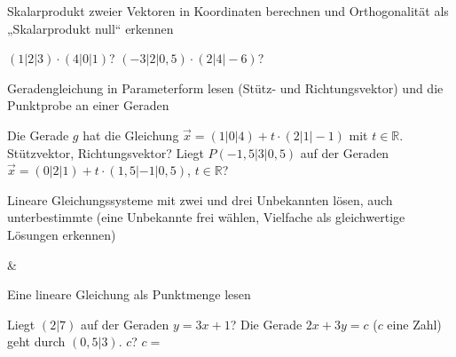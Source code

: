 \begin{aufgabe}{Skalarprodukt zweier Vektoren in Koordinaten berechnen und Orthogonalität als „Skalarprodukt null“ erkennen}
\begin{teile}
\teil $(1 | 2 | 3) \cdot (4 | 0 | 1)$?
\teil $(-3 | 2 | 0{,}5) \cdot (2 | 4 | -6)$?
\end{teile}
\end{aufgabe}

\begin{aufgabe}{Geradengleichung in Parameterform lesen (Stütz- und Richtungsvektor) und die Punktprobe an einer Geraden}
\begin{teile}
\teil Die Gerade $g$ hat die Gleichung $\vec x = (1 | 0 | 4) + t \cdot (2 | 1 | -1)$ mit $t \in \mathbb{R}$. Stützvektor, Richtungsvektor?
\teil Liegt $P(-1{,}5 | 3 | 0{,}5)$ auf der Geraden $\vec x = (0 | 2 | 1) + t \cdot (1{,}5 | -1 | 0{,}5)$, $t \in \mathbb{R}$?
\end{teile}
\end{aufgabe}

\begin{aufgabe}{Lineare Gleichungssysteme mit zwei und drei Unbekannten lösen, auch unterbestimmte (eine Unbekannte frei wählen, Vielfache als gleichwertige Lösungen erkennen)}
\begin{gleichungsraster}[2]
 &
 \\
\end{gleichungsraster}
\end{aufgabe}

\begin{aufgabe}{Eine lineare Gleichung als Punktmenge lesen}
\begin{teile}
\teil Liegt $(2 | 7)$ auf der Geraden $y = 3x + 1$?
\teil Die Gerade $2x + 3y = c$ ($c$ eine Zahl) geht durch $(0{,}5 | 3)$. $c$? $c = $ \leerfeld
\end{teile}
\end{aufgabe}

